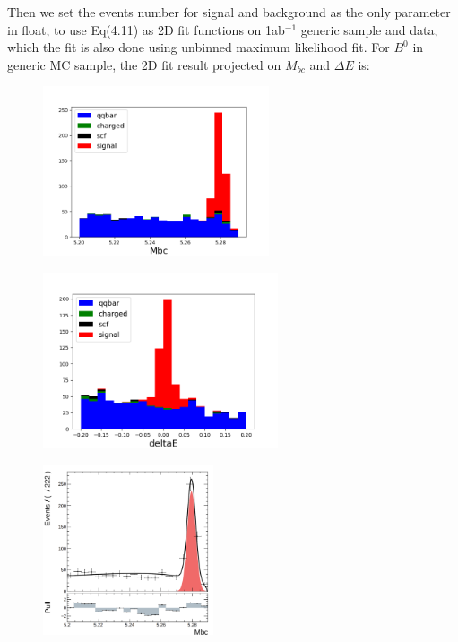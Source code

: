 Then we set the events number for signal and background as the only parameter in float, to use Eq(4.11) 
as 2D fit functions on 1ab$^{-1}$ generic sample and data, which the fit is also done using unbinned maximum likelihood fit.
For $B^0$ in generic MC sample, the 2D fit result projected on $M_{bc}$ and $\Delta E$ is: 
\begin{figure}[H]
	\begin{minipage}[b]{0.5\linewidth}
		\centering 
		\includegraphics[height=5cm]{figures/hist_stacked_generic_mbc}
		\label{}
	\end{minipage}
	\begin{minipage}[b]{0.5\linewidth}
		\centering 
		\includegraphics[height=5.2cm]{figures/hist_stacked_generic_dE}
		\label{}
	\end{minipage}
	\begin{minipage}[b]{0.5\linewidth}
		\centering 
		\includegraphics[height=5cm]{figures/mbc-hist-2d}
		\label{}
	\end{minipage}
	\begin{minipage}[b]{0.5\linewidth}

\end{minipage}
\end{figure}
